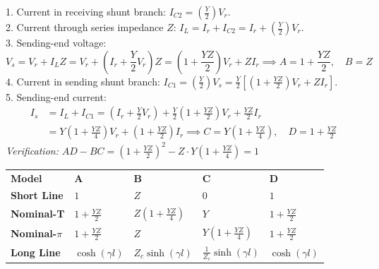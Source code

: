 \documentclass[11pt,a4paper]{article}
\newenvironment{Tip}[1][Key Engineering Insight]{\begin{tcolorbox}[tipbox, title=#1]}{\end{tcolorbox}}
\newenvironment{Deriv}[1][Mathematical Derivation]{\begin{tcolorbox}[derivbox, title=#1]}{\end{tcolorbox}}
\begin{document}
\begin{Deriv}[3. Medium Line: Nominal-$\pi$ Method ($80 - 250\,\text{km}$)]
\begin{center}
{%
}
\end{center}
1. Current in receiving shunt branch: $I_{C2} = \left(\frac{Y}{2}\right) V_r$.\\
2. Current through series impedance $Z$: $I_L = I_r + I_{C2} = I_r + \left(\frac{Y}{2}\right) V_r$.\\
3. Sending-end voltage:
\begin{equation}
  V_s = V_r + I_L Z = V_r + \left(I_r + \frac{Y}{2} V_r\right) Z = \left(1 + \frac{YZ}{2}\right) V_r + Z I_r \implies A = 1 + \frac{YZ}{2}, \quad B = Z
\end{equation}
4. Current in sending shunt branch: $I_{C1} = \left(\frac{Y}{2}\right) V_s = \frac{Y}{2} \left[ \left(1 + \frac{YZ}{2}\right) V_r + Z I_r \right]$.\\
5. Sending-end current:
\begin{align}
  I_s &= I_L + I_{C1} = \left( I_r + \frac{Y}{2} V_r \right) + \frac{Y}{2} \left(1 + \frac{YZ}{2}\right) V_r + \frac{YZ}{2} I_r \nonumber\\
      &= Y \left(1 + \frac{YZ}{4}\right) V_r + \left(1 + \frac{YZ}{2}\right) I_r \implies C = Y \left(1 + \frac{YZ}{4}\right), \quad D = 1 + \frac{YZ}{2}
\end{align}
\emph{Verification:} $AD - BC = \left(1 + \frac{YZ}{2}\right)^2 - Z \cdot Y\left(1 + \frac{YZ}{4}\right) = 1$ \quad \checkmark
\end{Deriv}

\begin{Tip}[Master Comparison of ABCD Parameters]
\begin{center}
\small
\begin{tabularx}{\textwidth}{L{2.5cm} C{2.2cm} C{2.5cm} C{2.8cm} C{2.2cm}}
  \color{white}\textbf{Model} & \color{white}\textbf{A} & \color{white}\textbf{B} & \color{white}\textbf{C} & \color{white}\textbf{D} \\
   \textbf{Short Line} & $1$ & $Z$ & $0$ & $1$ \\
  \textbf{Nominal-T} & $1 + \frac{YZ}{2}$ & $Z\left(1 + \frac{YZ}{4}\right)$ & $Y$ & $1 + \frac{YZ}{2}$ \\
   \textbf{Nominal-$\pi$} & $1 + \frac{YZ}{2}$ & $Z$ & $Y\left(1 + \frac{YZ}{4}\right)$ & $1 + \frac{YZ}{2}$ \\
  \textbf{Long Line} & $\cosh(\gamma l)$ & $Z_c \sinh(\gamma l)$ & $\frac{1}{Z_c}\sinh(\gamma l)$ & $\cosh(\gamma l)$ \\
\end{tabularx}
\end{center}
\end{Tip}
\end{document}
